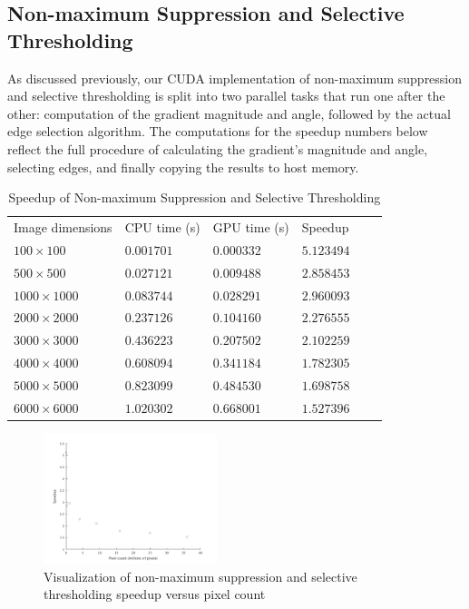 \documentclass[journal]{IEEEtran}
\begin{document}
\subsection{Non-maximum Suppression and Selective Thresholding}
As discussed previously, our CUDA implementation of non-maximum suppression and selective thresholding is split into two parallel tasks that run one after the other: computation of the gradient magnitude and angle, followed by the actual edge selection algorithm. The computations for the speedup numbers below reflect the full procedure of calculating the gradient's magnitude and angle, selecting edges, and finally copying the results to host memory.
\begin{table}[H]
	\small
	\centering
	\caption{Speedup of Non-maximum Suppression and Selective Thresholding}
	\label{non-maximum-suppression-selective-thresholding-speedup}
	\begin{tabular}{llllll}
	 Image dimensions & CPU time (s) & GPU time (s) & Speedup \\
	 $100 \times 100$ & $0.001701$ & $0.000332$ & $5.123494$ \\
	 $500 \times 500$ & $0.027121$ & $0.009488$ & $2.858453$ \\
	 $1000 \times 1000$ & $0.083744$ & $0.028291$ & $2.960093$ \\
	 $2000 \times 2000$ & $0.237126$ & $0.104160$ & $2.276555$ \\
	 $3000 \times 3000$ & $0.436223$ & $0.207502$ & $2.102259$ \\
	 $4000 \times 4000$ & $0.608094$ & $0.341184$ & $1.782305$ \\
	 $5000 \times 5000$ & $0.823099$ & $0.484530$ & $1.698758$ \\
	 $6000 \times 6000$ & $1.020302$ & $0.668001$ & $1.527396$ \\
	\end{tabular}
\end{table}
\begin{figure}[h]
	\centering
	\includegraphics[width=0.45\textwidth]{non_maximum_suppression_selective_thresholding_speedup_graph.jpg}
	\caption{Visualization of non-maximum suppression and selective thresholding speedup versus pixel count}
    \label{non-maximum-suppression-selective-thresholding-speedup-graph}
\end{figure}
\end{document}
